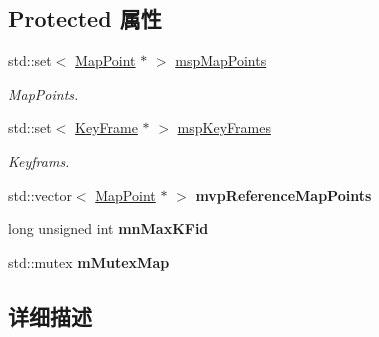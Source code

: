 \subsection*{Protected 属性}
\begin{DoxyCompactItemize}
\item 
\hypertarget{classORB__SLAM2_1_1Map_a2864c4d90418f02768c85d0255d1eca7}{std\-::set$<$ \hyperlink{classORB__SLAM2_1_1MapPoint}{Map\-Point} $\ast$ $>$ \hyperlink{classORB__SLAM2_1_1Map_a2864c4d90418f02768c85d0255d1eca7}{msp\-Map\-Points}}\label{classORB__SLAM2_1_1Map_a2864c4d90418f02768c85d0255d1eca7}

\begin{DoxyCompactList}\small\item\em Map\-Points. \end{DoxyCompactList}\item 
\hypertarget{classORB__SLAM2_1_1Map_abf1d31c2cb4df61d232bb7fbd7cfb61d}{std\-::set$<$ \hyperlink{classORB__SLAM2_1_1KeyFrame}{Key\-Frame} $\ast$ $>$ \hyperlink{classORB__SLAM2_1_1Map_abf1d31c2cb4df61d232bb7fbd7cfb61d}{msp\-Key\-Frames}}\label{classORB__SLAM2_1_1Map_abf1d31c2cb4df61d232bb7fbd7cfb61d}

\begin{DoxyCompactList}\small\item\em Keyframs. \end{DoxyCompactList}\item 
\hypertarget{classORB__SLAM2_1_1Map_ad1d98a7e8207b995494afa7c098a7aaf}{std\-::vector$<$ \hyperlink{classORB__SLAM2_1_1MapPoint}{Map\-Point} $\ast$ $>$ {\bfseries mvp\-Reference\-Map\-Points}}\label{classORB__SLAM2_1_1Map_ad1d98a7e8207b995494afa7c098a7aaf}

\item 
\hypertarget{classORB__SLAM2_1_1Map_abfafaf7ca3821cb069cb95fb88c91dfc}{long unsigned int {\bfseries mn\-Max\-K\-Fid}}\label{classORB__SLAM2_1_1Map_abfafaf7ca3821cb069cb95fb88c91dfc}

\item 
\hypertarget{classORB__SLAM2_1_1Map_a86b9fb9d5c601fb6fd88c46444bd553c}{std\-::mutex {\bfseries m\-Mutex\-Map}}\label{classORB__SLAM2_1_1Map_a86b9fb9d5c601fb6fd88c46444bd553c}

\end{DoxyCompactItemize}


\subsection{详细描述}


